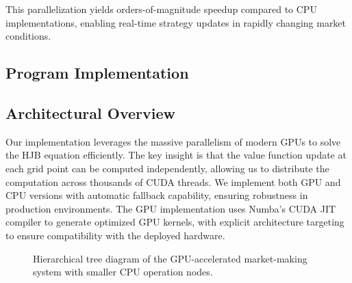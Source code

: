 \documentclass[onecolumn,ieee]{arithmaxresearch}
\begin{document}
This parallelization yields orders-of-magnitude speedup compared to CPU implementations, enabling real-time strategy updates in rapidly changing market conditions.
\begin{onecolumn}
    
\section{Program Implementation}
\subsection{Architectural Overview}

Our implementation leverages the massive parallelism of modern GPUs to solve the HJB equation efficiently. The key insight is that the value function update at each grid point can be computed independently, allowing us to distribute the computation across thousands of CUDA threads. We implement both GPU and CPU versions with automatic fallback capability, ensuring robustness in production environments. The GPU implementation uses Numba's CUDA JIT compiler to generate optimized GPU kernels, with explicit architecture targeting to ensure compatibility with the deployed hardware.

\begin{figure}[h]
\centering
{}
\caption{Hierarchical tree diagram of the GPU-accelerated market-making system with smaller CPU operation nodes.}
\label{fig:tree}
\end{figure}


\end{onecolumn}
\end{document}
